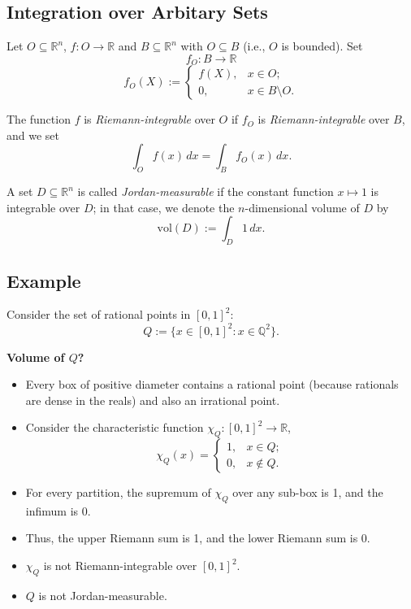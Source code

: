 \documentclass{article}
\begin{document}
\subsection{Integration over Arbitary Sets}
Let \( O \subseteq \mathbb{R}^n \), \( f: O \rightarrow \mathbb{R} \) and \( B \subseteq \mathbb{R}^n \) with \( O \subseteq B \) (i.e., \( O \) is bounded). Set  
\[ f_O : B \rightarrow \mathbb{R} \]  
\[ f_O(X) := 
\begin{cases} 
f(X), & x \in O; \\ 
0, & x \in B \setminus O.
\end{cases} \]

The function \( f \) is \textit{Riemann-integrable} over \( O \) if \( f_O \) is \textit{Riemann-integrable} over \( B \), and we set
\[ \int_{O} f(x) \, dx = \int_{B} f_O(x) \, dx. \]

A set \( D \subseteq \mathbb{R}^n \) is called \textit{Jordan-measurable} if the constant function \( x \mapsto 1 \) is integrable over \( D \); in that case, we denote the \( n \)-dimensional volume of \( D \) by
\[ \text{vol}(D) := \int_{D} 1 \, dx. \]

\subsection*{Example}
Consider the set of rational points in \([0, 1]^2\):
\[ Q := \{ x \in [0, 1]^2 : x \in \mathbb{Q}^2 \}. \]

\textbf{Volume of \( Q \)?}

\begin{itemize}
    \item Every box of positive diameter contains a rational point (because rationals are dense in the reals) and also an irrational point.
    \item Consider the characteristic function \( \chi_Q: [0, 1]^2 \rightarrow \mathbb{R} \),
    \[ \chi_Q(x) = 
    \begin{cases} 
    1, & x \in Q; \\ 
    0, & x \notin Q.
    \end{cases} \]
    \item For every partition, the supremum of \( \chi_Q \) over any sub-box is 1, and the infimum is 0.
    \item Thus, the upper Riemann sum is 1, and the lower Riemann sum is 0.
    \item \( \chi_Q \) is not Riemann-integrable over \([0, 1]^2\).
    \item \( Q \) is not Jordan-measurable.
\end{itemize}
\end{document}
